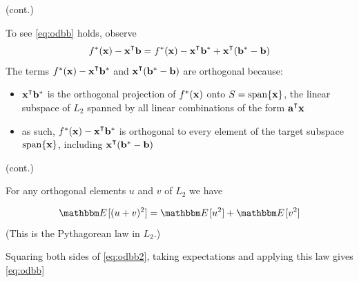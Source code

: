 \begin{frame}

    \vspace{2em}
    (cont.)
    
    To see  \eqref{eq:odbb} holds, observe
    \begin{equation}
        \label{eq:odbb2}
        f^*(\boldx) - \boldx^\T \boldb
        = f^*(\boldx) - \boldx^\T \boldb^* 
        + \boldx^\T ( \boldb^* - \boldb)
    \end{equation}
    The terms $f^*(\boldx) - \boldx^\T \boldb^*$ and 
    $\boldx^\T ( \boldb^* - \boldb)$ are orthogonal because:
    
    \begin{itemize}
    \item $\boldx^\T \boldb^*$ is the orthogonal projection of $f^*({\mathbf x})$ 
            onto $S = \operatorname{span}\{{\mathbf x}\}$, the linear subspace of $L_2$ spanned
            by all linear combinations of the form $\bolda^\T \boldx$
    \item  as such, $f^*(\boldx) - \boldx^\T \boldb^*$ is
            orthogonal to every element of the target subspace $\operatorname{span}\{{\mathbf x}\}$, 
            including $\boldx^\T ( \boldb^* - \boldb)$
    \end{itemize} 
        
            
\end{frame}

\begin{frame}

    \vspace{2em}
    (cont.)
    
    For any orthogonal elements $u$ and $v$ of
    $L_2$ we have 
    
    $$\EE[(u + v)^2] = \EE[u^2] + \EE[v^2]$$
    (This is the
    Pythagorean law in $L_2$.) 
    
    \vspace{.7em}
    Squaring both sides of 
    \eqref{eq:odbb2}, taking expectations and applying this law 
    gives \eqref{eq:odbb}
    \qedsymbol
  
\end{frame}



